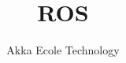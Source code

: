 


\title{ROS}
\author{}
\date{Akka Ecole Technology}



\begin{frame}
	\titlepage
\end{frame}










 














